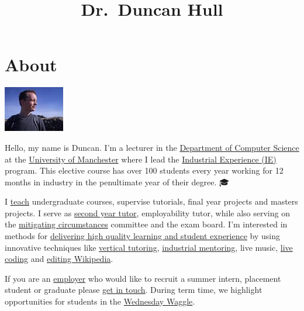 \documentclass[12pt,]{book}
\title{Dr.~Duncan Hull}
\author{}
\date{}
\begin{document}
\maketitle

{
\setcounter{tocdepth}{1}
\tableofcontents
}
\hypertarget{about}{%
\chapter*{About}\label{about}}

\begin{center}\includegraphics[width=0.4\linewidth]{images/me-blue} \end{center}

Hello, my name is Duncan. I'm a lecturer in the \href{https://www.cs.manchester.ac.uk/}{Department of Computer Science} at the \href{https://www.manchester.ac.uk}{University of Manchester} where I lead the \href{https://www.cs.manchester.ac.uk/study/undergraduate/industrial-experience/}{Industrial Experience (IE)} program. This elective course has over 100 students every year working for 12 months in industry in the penultimate year of their degree. 🎓

I \protect\hyperlink{teaching}{teach} undergraduate courses, supervise tutorials, final year projects and masters projects. I serve as \href{http://studentnet.cs.manchester.ac.uk/ugt/year2/}{second year tutor}, employability tutor, while also serving on the \href{http://www.studentsupport.manchester.ac.uk/study-support/mitigating-circumstances/}{mitigating circumstances} committee and the exam board. I'm interested in methods for \protect\hyperlink{research}{delivering high quality learning and student experience} by using innovative techniques like \protect\hyperlink{vertical-tutoring-1}{vertical tutoring}, \href{https://www.cs.manchester.ac.uk/connect/business-engagement/industrial-mentoring/}{industrial mentoring}, live music, \href{https://en.wikipedia.org/wiki/Live_coding}{live coding} and \protect\hyperlink{wikipedia}{editing Wikipedia}.

If you are an \protect\hyperlink{employers}{employer} who would like to recruit a summer intern, placement student or graduate please \protect\hyperlink{contact}{get in touch}. During term time, we highlight opportunities for students in the \href{https://waggle.cs.manchester.ac.uk/waggle/about}{Wednesday Waggle}. 🐝
\end{document}
